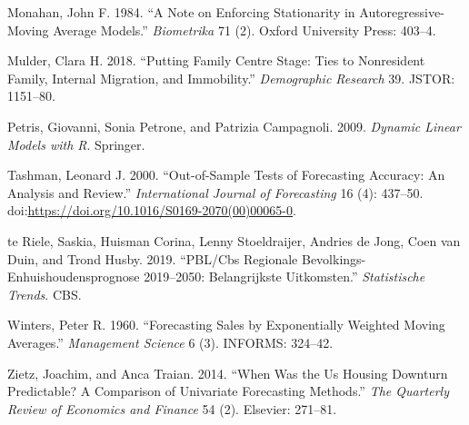 \documentclass[]{article}
\begin{document}
\hypertarget{ref-monahan1984note}{}
Monahan, John F. 1984. ``A Note on Enforcing Stationarity in
Autoregressive-Moving Average Models.'' \emph{Biometrika} 71 (2). Oxford
University Press: 403--4.

\hypertarget{ref-mulder2018putting}{}
Mulder, Clara H. 2018. ``Putting Family Centre Stage: Ties to
Nonresident Family, Internal Migration, and Immobility.''
\emph{Demographic Research} 39. JSTOR: 1151--80.

\hypertarget{ref-petris2009dynamic}{}
Petris, Giovanni, Sonia Petrone, and Patrizia Campagnoli. 2009.
\emph{Dynamic Linear Models with R}. Springer.

\hypertarget{ref-tashman2000out}{}
Tashman, Leonard J. 2000. ``Out-of-Sample Tests of Forecasting Accuracy:
An Analysis and Review.'' \emph{International Journal of Forecasting} 16
(4): 437--50.
doi:\href{https://doi.org/https://doi.org/10.1016/S0169-2070(00)00065-0}{https://doi.org/10.1016/S0169-2070(00)00065-0}.

\hypertarget{ref-teriele2019}{}
te Riele, Saskia, Huisman Corina, Lenny Stoeldraijer, Andries de Jong,
Coen van Duin, and Trond Husby. 2019. ``PBL/Cbs Regionale Bevolkings-
Enhuishoudensprognose 2019--2050: Belangrijkste Uitkomsten.''
\emph{Statistische Trends}. CBS.

\hypertarget{ref-winters1960forecasting}{}
Winters, Peter R. 1960. ``Forecasting Sales by Exponentially Weighted
Moving Averages.'' \emph{Management Science} 6 (3). INFORMS: 324--42.

\hypertarget{ref-zietz2014us}{}
Zietz, Joachim, and Anca Traian. 2014. ``When Was the Us Housing
Downturn Predictable? A Comparison of Univariate Forecasting Methods.''
\emph{The Quarterly Review of Economics and Finance} 54 (2). Elsevier:
271--81.
\end{document}
